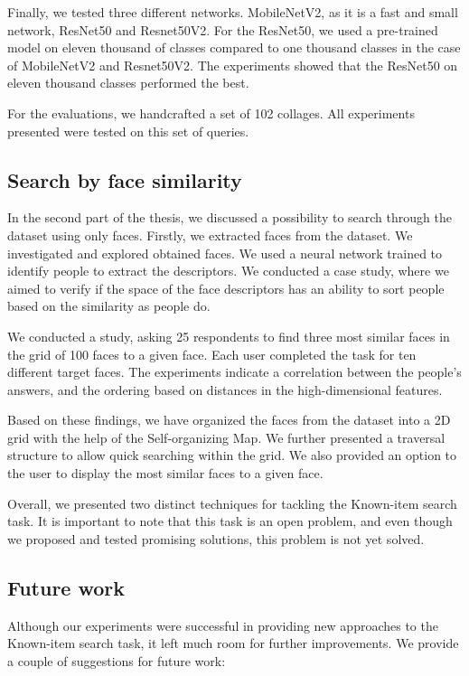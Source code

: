 Finally, we tested three different networks. MobileNetV2, as it is a fast and small network, ResNet50 and Resnet50V2. For the ResNet50, we used a pre-trained model on eleven thousand of classes compared to one thousand classes in the case of MobileNetV2 and Resnet50V2. The experiments showed that the ResNet50 on eleven thousand classes performed the best.

For the evaluations, we handcrafted a set of 102 collages. All experiments presented were tested on this set of queries.

\subsection*{Search by face similarity}

In the second part of the thesis, we discussed a possibility to search through the dataset using only faces. Firstly, we extracted faces from the dataset. We investigated and explored obtained faces. We used a neural network trained to identify people to extract the descriptors. We conducted a case study, where we aimed to verify if the space of the face descriptors has an ability to sort people based on the similarity as people do.

We conducted a study, asking 25 respondents to find three most similar faces in the grid of 100 faces to a given face. Each user completed the task for ten different target faces. The experiments indicate a correlation between the people's answers, and the ordering based on distances in the high-dimensional features.

Based on these findings, we have organized the faces from the dataset into a 2D grid with the help of the Self-organizing Map. We further presented a traversal structure to allow quick searching within the grid. We also provided an option to the user to display the most similar faces to a given face.

\vspace{1em}

Overall, we presented two distinct techniques for tackling the Known-item search task. It is important to note that this task is an open problem, and even though we proposed and tested promising solutions, this problem is not yet solved. 

\subsection*{Future work}

Although our experiments were successful in providing new approaches to the Known-item search task, it left much room for further improvements. We provide a couple of suggestions for future work:

